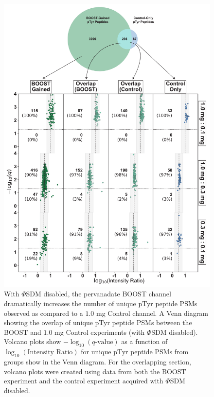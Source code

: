 \documentclass[journal=jprobs,manuscript=article]{achemso}
\begin{document}
\begin{figure}[t!]
\centering
\includegraphics[width=135mm]{figures/supplements/boost_control_gained_qvolcanoes.pdf}
\caption{With $\Phi$SDM disabled, the pervanadate BOOST channel dramatically increases the number of unique pTyr peptide PSMs observed as compared to a $1.0$ mg Control channel. A Venn diagram showing the overlap of unique pTyr peptide PSMs between the BOOST and $1.0$ mg Control experiments (with $\Phi$SDM disabled). Volcano plots show $-\log_{10}(q\text{-value})$ as a function of $\log_{10}(\text{Intensity Ratio})$ for unique pTyr peptide PSMs from groups show in the Venn diagram. For the overlapping section, volcano plots were created using data from both the BOOST experiment and the control experiment acquired with $\Phi$SDM disabled. }\label{boost_control_gained_qvolcanoes}
\end{figure}
\end{document}
